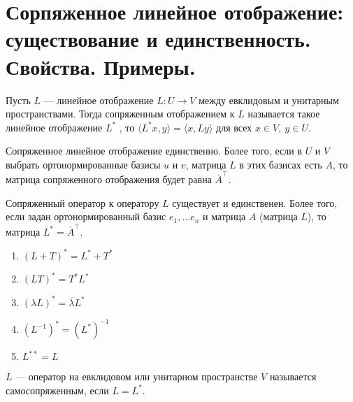 \section{Сорпяженное линейное отображение: существование и единственность. Свойства. Примеры.}
\begin{defn}
    Пусть $ L$ --- линейное отображение  $ L \colon U \to  V$ между евклидовым и унитарным пространствами.  Тогда {\sf сопряженным отображением к $ L$} называется такое линейное отображение $ L^{*}$ , то $ \langle L^{*}x, y \rangle = \langle x, Ly \rangle$ для всех $ x \in V, ~ y \in U$. 
\end{defn}
\begin{thm}
    Сопряженное линейное отображение единственно. Более того, если в $ U$ и  $ V$ выбрать ортонормированные базисы  $ u$ и  $ v$, матрица  $ L$ в этих базисах есть $ A$, то матрица сопряженного отображения будет равна  $ \overline{A}^{\top}$.
\end{thm}
\begin{cor}
    Сопряженный оператор к оператору  $ L$ существует и единственен. Более того, если задан ортонормированный базис $ e_1, \ldots e_n$ и матрица $ A$ (матрица  $ L$), то матрица  $ L^{*} = \overline{A}^{\top}$.
\end{cor}
\begin{lm}
    \begin{enumerate}[noitemsep]
	\item $ (L + T)^{* } = L^{*}+T^{*}$
	\item $ (LT)^{*} = T^{*}L^{*}$
	\item $ (\lambda L)^{*} = \overline{ \lambda }L^{*}$ 
	\item $ (L^{-1})^{*} = (L^{*})^{-1}$
	\item $ L^{**} = L$
    \end{enumerate} 
\end{lm}
\begin{defn}[Самомопряженность]
    $ L$ --- оператор на евклидовом или унитарном пространстве  $ V$ называется {\sf самосопряженным}, если $ L = L^{*}$.  
\end{defn}
